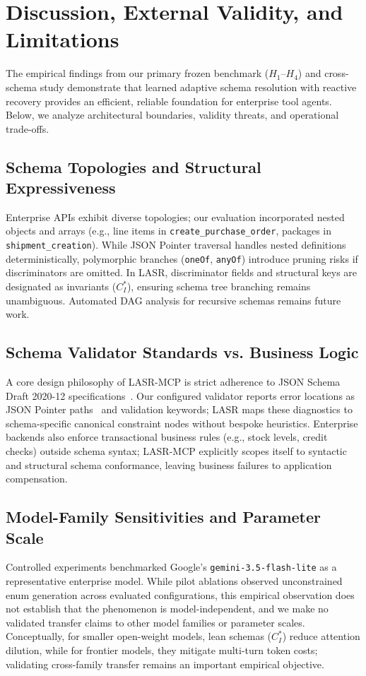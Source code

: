 \section{Discussion, External Validity, and Limitations}
\label{sec:discussion}

The empirical findings from our primary frozen benchmark ($H_1$--$H_4$) and cross-schema study demonstrate that learned adaptive schema resolution with reactive recovery provides an efficient, reliable foundation for enterprise tool agents. Below, we analyze architectural boundaries, validity threats, and operational trade-offs.

\subsection{Schema Topologies and Structural Expressiveness}
Enterprise APIs exhibit diverse topologies; our evaluation incorporated nested objects and arrays (e.g., line items in \texttt{create\_purchase\_order}, packages in \texttt{shipment\_creation}). While JSON Pointer traversal handles nested definitions deterministically, polymorphic branches (\texttt{oneOf}, \texttt{anyOf}) introduce pruning risks if discriminators are omitted. In LASR, discriminator fields and structural keys are designated as invariants ($C_I^*$), ensuring schema tree branching remains unambiguous. Automated DAG analysis for recursive schemas remains future work.

\subsection{Schema Validator Standards vs. Business Logic}
A core design philosophy of LASR-MCP is strict adherence to JSON Schema Draft 2020-12 specifications~\cite{jsonschema202012}. Our configured validator reports error locations as JSON Pointer paths~\cite{rfc6901} and validation keywords; LASR maps these diagnostics to schema-specific canonical constraint nodes without bespoke heuristics. Enterprise backends also enforce transactional business rules (e.g., stock levels, credit checks) outside schema syntax; LASR-MCP explicitly scopes itself to syntactic and structural schema conformance, leaving business failures to application compensation.

\subsection{Model-Family Sensitivities and Parameter Scale}
Controlled experiments benchmarked Google's \texttt{gemini-3.5-flash-lite} as a representative enterprise model. While pilot ablations observed unconstrained enum generation across evaluated configurations, this empirical observation does not establish that the phenomenon is model-independent, and we make no validated transfer claims to other model families or parameter scales. Conceptually, for smaller open-weight models, lean schemas ($C_I^*$) reduce attention dilution, while for frontier models, they mitigate multi-turn token costs; validating cross-family transfer remains an important empirical objective.

